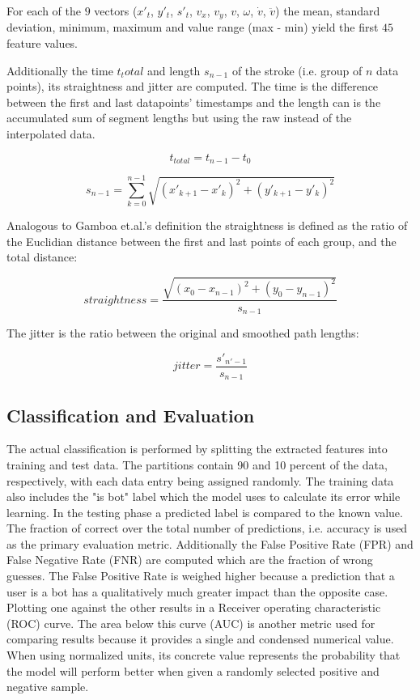 \documentclass[
    fontsize=12pt,
    headings=small,
    parskip=half,           %
    bibliography=totoc,
    numbers=noenddot,       %
    open=any,               %
    final                   %
]{scrreprt}
\begin{document}
For each of the $9$ vectors ($x'_t$, $y'_t$, $s'_t$, $v_x$, $v_y$, $v$, $\omega$, $\dot{v}$, $\ddot{v}$) the mean, standard deviation, minimum, maximum and value range (max - min) yield the first $45$ feature values.

Additionally the time $t_total$ and length $s_{n-1}$ of the stroke (i.e. group of $n$ data points), its straightness and jitter are computed. The time is the difference between the first and last datapoints' timestamps and the length can is the accumulated sum of segment lengths but using the raw instead of the interpolated data.

\[
t_{total} = t_{n-1} - t_0
\]

\[
s_{n-1} = \sum_{k = 0}^{n - 1} \sqrt{(x'_{k+1} - x'_{k})^2 + (y'_{k+1} - y'_{k})^2}
\]

Analogous to Gamboa et.al.'s definition\cite{GAMBOA2004} the straightness is defined as the ratio of the Euclidian distance between the first and last points of each group, and the total distance:

\[
straightness = \frac{ \sqrt{ (x_0 - x_{n-1})^2 + (y_0 - y_{n-1})^2 } }{s_{n-1}}
\]

The jitter is the ratio between the original and smoothed path lengths:

\[
jitter = \frac{s'_{n'-1}}{s_{n-1}}
\]



\subsection{Classification and Evaluation}

The actual classification is performed by splitting the extracted features into training and test data. The partitions contain 90 and 10 percent of the data, respectively, with each data entry being assigned randomly. The training data also includes the "is bot" label which the model uses to calculate its error while learning. In the testing phase a predicted label is compared to the known value. The fraction of correct over the total number of predictions, i.e. accuracy is used as the primary evaluation metric. Additionally the False Positive Rate (FPR) and False Negative Rate (FNR) are computed which are the fraction of wrong guesses. The False Positive Rate is weighed higher because a prediction that a user is a bot has a qualitatively much greater impact than the opposite case. Plotting one against the other results in a Receiver operating characteristic (ROC) curve. The area below this curve (AUC) is another metric used for comparing results because it provides a single and condensed numerical value. When using normalized units, its concrete value represents the probability that the model will perform better when given a randomly selected positive and negative sample.\cite{FAWCETT2006861}
\end{document}
